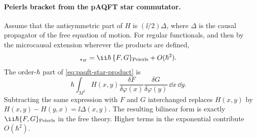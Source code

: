 \paragraph{Peierls bracket from the pAQFT star commutator.}
Assume that the antisymmetric part of \(H\) is \((\ii/2)\Delta\), where
\(\Delta\) is the causal propagator of the free equation of motion.  For
regular functionals, and then by the microcausal extension wherever the
products are defined,
\begin{equation}
  [F,G]_{\star_H}
  =
  \ii\hbar\,\{F,G\}_{\rm Peierls}
  +O(\hbar^2).
  \label{eq:paqft-star-commutator-peierls}
\end{equation}
The order-\(\hbar\) part of
\eqref{eq:paqft-star-product} is
\[
  \hbar\int_{M^2} H(x,y)
  \frac{\delta F}{\delta\varphi(x)}
  \frac{\delta G}{\delta\varphi(y)}\,\dd x\,\dd y .
\]
Subtracting the same expression with \(F\) and \(G\) interchanged replaces
\(H(x,y)\) by \(H(x,y)-H(y,x)=\ii\Delta(x,y)\).  The resulting bilinear form
is exactly \(\ii\hbar\{F,G\}_{\rm Peierls}\) in the free theory.  Higher terms
in the exponential contribute \(O(\hbar^2)\).

